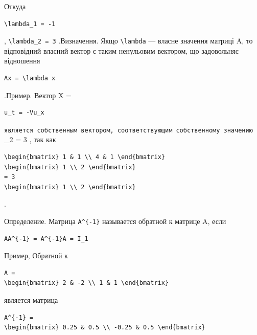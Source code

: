 \documentclass[
  ukrainian,
]{article}
\begin{document}
Откуда

\begin{verbatim}
\lambda_1 = -1
\end{verbatim}

, \texttt{\textbackslash{}lambda\_2\ =\ 3} .Визначення. Якщо
\texttt{\textbackslash{}lambda} --- власне значення матриці A, то
відповідний власний вектор є таким ненульовим вектором, що задовольняє
відношення

\begin{verbatim}
Ax = \lambda x
\end{verbatim}

.Пример. Вектор X =

\begin{verbatim}
u_t = -Vu_x
\end{verbatim}

\texttt{является\ собственным\ вектором,\ соответствующим\ собственному\ значению}
\lambda\_2 = 3 , так как

\begin{verbatim}
\begin{bmatrix} 1 & 1 \\ 4 & 1 \end{bmatrix}
\begin{bmatrix} 1 \\ 2 \end{bmatrix}
= 3
\begin{bmatrix} 1 \\ 2 \end{bmatrix}
\end{verbatim}

.

Определение. Матрица \texttt{A\^{}\{-1\}} называется обратной к матрице
A, если

\begin{verbatim}
AA^{-1} = A^{-1}A = I_1
\end{verbatim}

Пример, Обратной к

\begin{verbatim}
A =
\begin{bmatrix} 2 & -2 \\ 1 & 1 \end{bmatrix}
\end{verbatim}

является матрица

\begin{verbatim}
A^{-1} =
\begin{bmatrix} 0.25 & 0.5 \\ -0.25 & 0.5 \end{bmatrix}
\end{verbatim}
\end{document}

